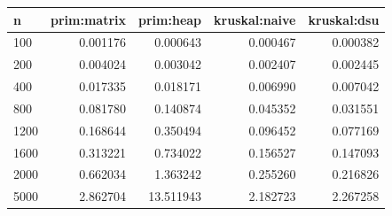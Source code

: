 \begin{tabular}{lrrrr}
\hline
n & prim:matrix & prim:heap & kruskal:naive & kruskal:dsu \\
\hline
100 & 0.001176 & 0.000643 & 0.000467 & 0.000382 \\
200 & 0.004024 & 0.003042 & 0.002407 & 0.002445 \\
400 & 0.017335 & 0.018171 & 0.006990 & 0.007042 \\
800 & 0.081780 & 0.140874 & 0.045352 & 0.031551 \\
1200 & 0.168644 & 0.350494 & 0.096452 & 0.077169 \\
1600 & 0.313221 & 0.734022 & 0.156527 & 0.147093 \\
2000 & 0.662034 & 1.363242 & 0.255260 & 0.216826 \\
5000 & 2.862704 & 13.511943 & 2.182723 & 2.267258 \\
\hline
\end{tabular}
